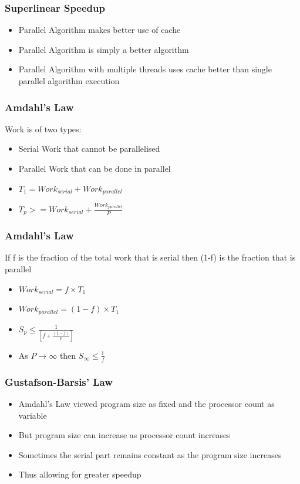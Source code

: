 \documentclass{beamer}
\begin{document}
\begin{frame}[fragile]
	\frametitle{Superlinear Speedup}
\begin{itemize}
\item Parallel Algorithm makes better use of cache
\item Parallel Algorithm is simply a better algorithm
\item Parallel Algorithm with multiple threads uses cache better than single parallel algorithm execution
\end{itemize}
\end{frame}

\begin{frame}[fragile]
	\frametitle{Amdahl's Law}
	Work is of two types:
\begin{itemize}
\item Serial Work that cannot be parallelised
\item Parallel Work that can be done in parallel
\item $T_{1}=Work_{serial} + Work_{parallel}$
\item $T_{p}>=Work_{serial}+\frac{Work_{parallel}}{P}$
	
\end{itemize}
\end{frame}
\begin{frame}[fragile]
	\frametitle{Amdahl's Law}
	If f is the fraction of the total work that is serial then (1-f) is the fraction that is parallel
\begin{itemize}
\item $Work_{serial} = f\times T_{1}$
\item $Work_{parallel}=(1-f)\times T_{1}$
\item $S_{p}\leq \frac{1}{[f+\frac{(1-f)}{p}]}$
\item As $P \rightarrow \infty$ then $S_{\infty}\leq \frac{1}{f}$
\end{itemize}

\end{frame}

\begin{frame}[fragile]
	\frametitle{Gustafson-Barsis’ Law}
\begin{itemize}
\item Amdahl’s Law viewed program size as fixed and the processor count as variable
\item But program size can increase as processor count increases
\item Sometimes the serial part remains constant as the program size increases
\item Thus allowing for greater speedup
\end{itemize}
\end{frame}
\end{document}
